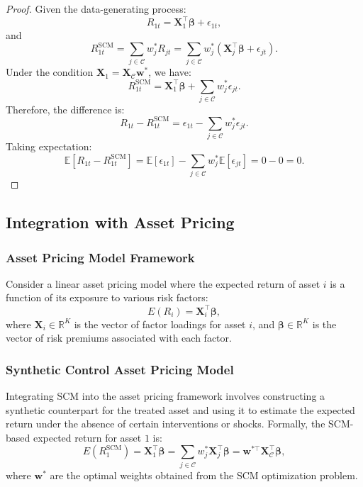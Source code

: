 \begin{proof}
Given the data-generating process:
\[
R_{1t} = \mathbf{X}_1^\top \boldsymbol{\beta} + \epsilon_{1t},
\]
and
\[
R_{1t}^{\text{SCM}} = \sum_{j \in \mathcal{C}} w_j^* R_{jt} = \sum_{j \in \mathcal{C}} w_j^* \left( \mathbf{X}_j^\top \boldsymbol{\beta} + \epsilon_{jt} \right).
\]
Under the condition $\mathbf{X}_1 = \mathbf{X}_{\mathcal{C}} \mathbf{w}^*$, we have:
\[
R_{1t}^{\text{SCM}} = \mathbf{X}_1^\top \boldsymbol{\beta} + \sum_{j \in \mathcal{C}} w_j^* \epsilon_{jt}.
\]
Therefore, the difference is:
\[
R_{1t} - R_{1t}^{\text{SCM}} = \epsilon_{1t} - \sum_{j \in \mathcal{C}} w_j^* \epsilon_{jt}.
\]
Taking expectation:
\[
\mathbb{E}[R_{1t} - R_{1t}^{\text{SCM}}] = \mathbb{E}[\epsilon_{1t}] - \sum_{j \in \mathcal{C}} w_j^* \mathbb{E}[\epsilon_{jt}] = 0 - 0 = 0.
\]
\end{proof}

\subsection{Integration with Asset Pricing}

\subsubsection{Asset Pricing Model Framework}

Consider a linear asset pricing model where the expected return of asset $i$ is a function of its exposure to various risk factors:
\[
E(R_i) = \mathbf{X}_i^\top \boldsymbol{\beta},
\]
where $\mathbf{X}_i \in \mathbb{R}^K$ is the vector of factor loadings for asset $i$, and $\boldsymbol{\beta} \in \mathbb{R}^K$ is the vector of risk premiums associated with each factor.

\subsubsection{Synthetic Control Asset Pricing Model}

Integrating SCM into the asset pricing framework involves constructing a synthetic counterpart for the treated asset and using it to estimate the expected return under the absence of certain interventions or shocks. Formally, the SCM-based expected return for asset $1$ is:
\[
E(R_1^{\text{SCM}}) = \mathbf{X}_1^\top \boldsymbol{\beta} = \sum_{j \in \mathcal{C}} w_j^* \mathbf{X}_j^\top \boldsymbol{\beta} = \mathbf{w}^{*\top} \mathbf{X}_{\mathcal{C}}^\top \boldsymbol{\beta},
\]
where $\mathbf{w}^*$ are the optimal weights obtained from the SCM optimization problem.

